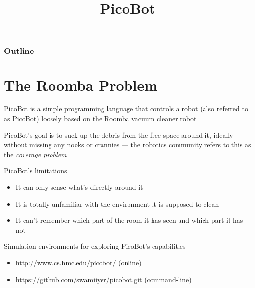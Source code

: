 \documentclass[8pt,a4paper,compress]{beamer}
\title{PicoBot}
\date{}
\begin{document}
\begin{frame}
\vfill
\titlepage
\end{frame}

\begin{frame}
\frametitle{Outline}
\tableofcontents
\end{frame}

\section{The Roomba Problem}
\begin{frame}[fragile]
PicoBot is a simple programming language that controls a robot (also referred to as PicoBot) loosely based on the Roomba vacuum cleaner robot

\bigskip

PicoBot's goal is to suck up the debris from the free space around it, ideally without missing any nooks or crannies --- the robotics community refers to this as the \emph{coverage problem}

\bigskip

PicoBot's limitations
\begin{itemize}
\item It can only sense what's directly around it

\item It is totally unfamiliar with the environment it is supposed to clean

\item It can't remember which part of the room it has seen and which part it has not
\end{itemize}

\bigskip

Simulation environments for exploring PicoBot's capabilities
\begin{itemize}
\item \href{http://www.cs.hmc.edu/picobot/}{http://www.cs.hmc.edu/picobot/} (online)

\item \href{https://github.com/swamiiyer/picobot.git}{https://github.com/swamiiyer/picobot.git} (command-line)
\end{itemize}
\end{frame}
\end{document}
